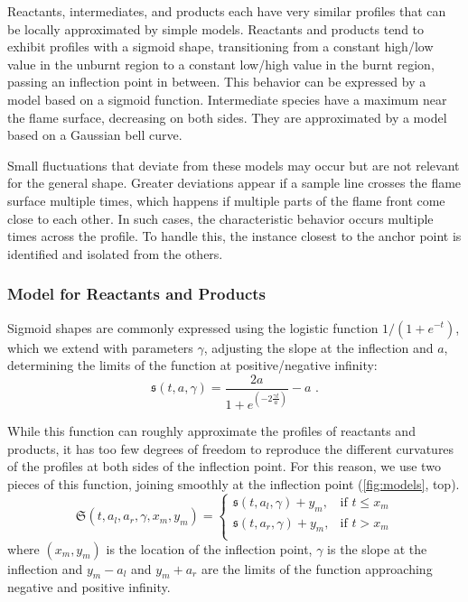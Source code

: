 %
Reactants, intermediates, and products each have very similar profiles that can
be locally approximated by simple models.
%
Reactants and products tend to exhibit profiles with a sigmoid shape,
transitioning from a constant high/low value in the unburnt region to a constant
low/high value in the burnt region, passing an inflection point in between.
%
This behavior can be expressed by a model based on a sigmoid function.
%
Intermediate species have a maximum near the flame surface, decreasing on both
sides.
%
They are approximated by a model based on a Gaussian bell curve.
%

%
Small fluctuations that deviate from these models may occur but are not relevant
for the general shape.
%
Greater deviations appear if a sample line crosses the flame surface multiple
times, which happens if multiple parts of the flame front come close to each
other.
%
In such cases, the characteristic behavior occurs multiple times across the
profile.
%
To handle this, the instance closest to the anchor point is identified and
isolated from the others.
%
\subsubsection{Model for Reactants and Products} %
\label{ssub:model_for_reactants_products}
%
Sigmoid shapes are commonly expressed using the logistic function $1/(1+e^{-t})$,
which we extend with parameters $\gamma$, adjusting the slope at the inflection
and $a$, determining the limits of the function at positive/negative infinity:
%
\begin{equation}
	\mathfrak{s}(t,a,\gamma)
		= \frac{2a}{ 1 + e^{ (-2\frac{\gamma t}{a}) } } - a \text{ .}
\end{equation}
%

%
While this function can roughly approximate the profiles of reactants and
products, it has too few degrees of freedom to reproduce the different
curvatures of the profiles at both sides of the inflection point.
%
For this reason, we use two pieces of this function, joining smoothly at the
inflection point (\cref{fig:models}, top).
%
\begin{equation}
		\mathfrak{S}(t, a_l, a_r, \gamma, x_m, y_m) =
		\begin{cases}
			\mathfrak{s}(t, a_l, \gamma) + y_m, &\text{if }  t \leq x_m\\
			\mathfrak{s}(t, a_r, \gamma) + y_m, & \text{if }  t > x_m\\
		\end{cases}
\end{equation}
%
where $(x_m, y_m)$ is the location of the inflection point, $\gamma$ is the
slope at the inflection and $y_m-a_l$ and $y_m+a_r$ are the limits of the
function approaching negative and positive infinity.
%
%
